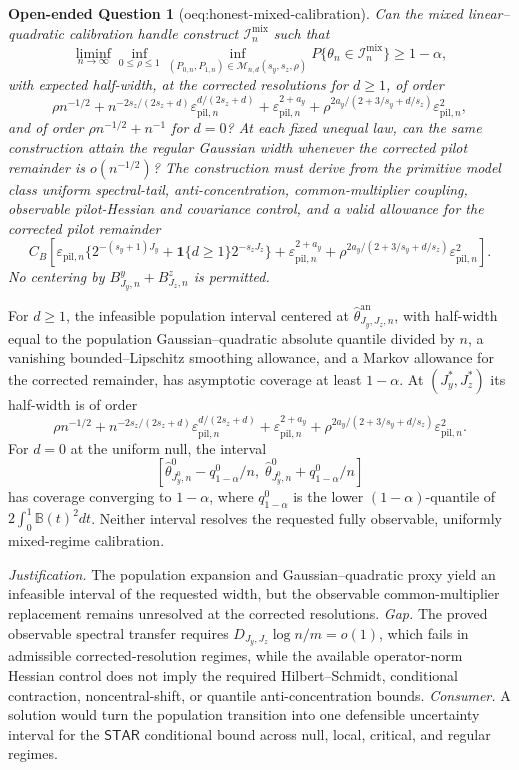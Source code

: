 \documentclass{article}
\newtheorem{openendedquestion}{Open-ended Question}
\begin{document}
\begin{openendedquestion}[oeq:honest-mixed-calibration]\label{oeq:honest-mixed-calibration}
Can the mixed linear--quadratic calibration handle construct \(\mathcal I_n^{\mathrm{mix}}\) such that
\[
\liminf_{n\to\infty}\inf_{0\le\rho\le1}\inf_{(P_{0,n},P_{1,n})\in\mathcal M_{n,d}(s_y,s_z,\rho)}P\{\theta_n\in\mathcal I_n^{\mathrm{mix}}\}\ge1-\alpha,
\]
with expected half-width, at the corrected resolutions for \(d\ge1\), of order
\[
\rho n^{-1/2}
+n^{-2s_z/(2s_z+d)}\varepsilon_{\mathrm{pil},n}^{d/(2s_z+d)}
+\varepsilon_{\mathrm{pil},n}^{2+a_y}
+\rho^{2a_y/(2+3/s_y+d/s_z)}\varepsilon_{\mathrm{pil},n}^2,
\]
and of order \(\rho n^{-1/2}+n^{-1}\) for \(d=0\)?  At each fixed unequal law, can the same construction attain the regular Gaussian width whenever the corrected pilot remainder is \(o(n^{-1/2})\)? The construction must derive from the primitive model class uniform spectral-tail, anti-concentration, common-multiplier coupling, observable pilot-Hessian and covariance control, and a valid allowance for the corrected pilot remainder
\[
C_B\left[
\varepsilon_{\mathrm{pil},n}\{2^{-(s_y+1)J_y}+\mathbf 1\{d\ge1\}2^{-s_zJ_z}\}
+\varepsilon_{\mathrm{pil},n}^{2+a_y}
+\rho^{2a_y/(2+3/s_y+d/s_z)}\varepsilon_{\mathrm{pil},n}^2
\right].
\]
No centering by \(B^y_{J_y,n}+B^z_{J_z,n}\) is permitted.
\end{openendedquestion}
For \(d\ge1\), the infeasible population interval centered at \(\widehat\theta^{\mathrm{an}}_{J_y,J_z,n}\), with half-width equal to the population Gaussian--quadratic absolute quantile divided by \(n\), a vanishing bounded--Lipschitz smoothing allowance, and a Markov allowance for the corrected remainder, has asymptotic coverage at least \(1-\alpha\). At \((J_y^*,J_z^*)\) its half-width is of order \[\rho n^{-1/2}+n^{-2s_z/(2s_z+d)}\varepsilon_{\mathrm{pil},n}^{d/(2s_z+d)}+\varepsilon_{\mathrm{pil},n}^{2+a_y}+\rho^{2a_y/(2+3/s_y+d/s_z)}\varepsilon_{\mathrm{pil},n}^2.\] For \(d=0\) at the uniform null, the interval \[\left[\widehat\theta^0_{J_y^0,n}-q^0_{1-\alpha}/n,\;\widehat\theta^0_{J_y^0,n}+q^0_{1-\alpha}/n\right]\] has coverage converging to \(1-\alpha\), where \(q^0_{1-\alpha}\) is the lower \((1-\alpha)\)-quantile of \(2\int_0^1\mathbb B(t)^2dt\). Neither interval resolves the requested fully observable, uniformly mixed-regime calibration.
\par\smallskip\noindent \textit{Justification.} The population expansion and Gaussian--quadratic proxy yield an infeasible interval of the requested width, but the observable common-multiplier replacement remains unresolved at the corrected resolutions. \textit{Gap.} The proved observable spectral transfer requires \(D_{J_y,J_z}\log n/m=o(1)\), which fails in admissible corrected-resolution regimes, while the available operator-norm Hessian control does not imply the required Hilbert--Schmidt, conditional contraction, noncentral-shift, or quantile anti-concentration bounds. \textit{Consumer.} A solution would turn the population transition into one defensible uncertainty interval for the \(\mathsf{STAR}\) conditional bound across null, local, critical, and regular regimes.
\end{document}
